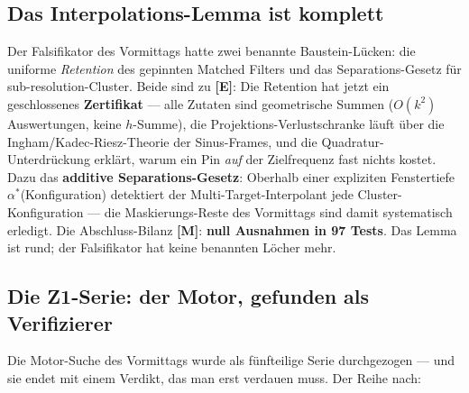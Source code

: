 \documentclass[11pt,a4paper]{article}
\newcommand{\E}{\textcolor{gut}{\textbf{[E]}}}
\newcommand{\M}{\textcolor{mess}{\textbf{[M]}}}
\begin{document}
\subsection*{Das Interpolations-Lemma ist komplett}

Der Falsifikator des Vormittags hatte zwei benannte Baustein-Lücken:
die uniforme \emph{Retention} des gepinnten Matched Filters und das
Separations-Gesetz für sub-resolution-Cluster. Beide sind zu \E{}:
Die Retention hat jetzt ein geschlossenes \textbf{Zertifikat} ---
alle Zutaten sind geometrische Summen ($O(k^2)$ Auswertungen, keine
$h$-Summe), die Projektions-Verlustschranke läuft über die
Ingham/Kadec-Riesz-Theorie der Sinus-Frames, und die
Quadratur-Unterdrückung erklärt, warum ein Pin \emph{auf} der
Zielfrequenz fast nichts kostet. Dazu das \textbf{additive
Separations-Gesetz}: Oberhalb einer expliziten Fenstertiefe
$\alpha^*$(Konfiguration) detektiert der Multi-Target-Interpolant
jede Cluster-Konfiguration --- die Maskierungs-Reste des Vormittags
sind damit systematisch erledigt. Die Abschluss-Bilanz \M{}:
\textbf{null Ausnahmen in 97 Tests}. Das Lemma ist rund; der
Falsifikator hat keine benannten Löcher mehr.

\subsection*{Die Z1-Serie: der Motor, gefunden als Verifizierer}

Die Motor-Suche des Vormittags wurde als fünfteilige Serie
durchgezogen --- und sie endet mit einem Verdikt, das man erst
verdauen muss. Der Reihe nach:
\end{document}
